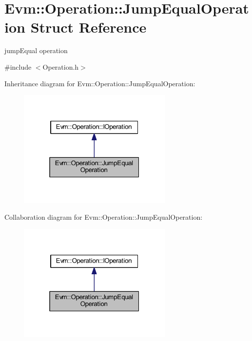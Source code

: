 \hypertarget{struct_evm_1_1_operation_1_1_jump_equal_operation}{}\section{Evm\+:\+:Operation\+:\+:Jump\+Equal\+Operation Struct Reference}
\label{struct_evm_1_1_operation_1_1_jump_equal_operation}


jump\+Equal operation  




{\ttfamily \#include $<$Operation.\+h$>$}



Inheritance diagram for Evm\+:\+:Operation\+:\+:Jump\+Equal\+Operation\+:
\nopagebreak
\begin{figure}[H]
\begin{center}
\leavevmode
\includegraphics[width=217pt]{struct_evm_1_1_operation_1_1_jump_equal_operation__inherit__graph}
\end{center}
\end{figure}


Collaboration diagram for Evm\+:\+:Operation\+:\+:Jump\+Equal\+Operation\+:
\nopagebreak
\begin{figure}[H]
\begin{center}
\leavevmode
\includegraphics[width=217pt]{struct_evm_1_1_operation_1_1_jump_equal_operation__coll__graph}
\end{center}
\end{figure}
